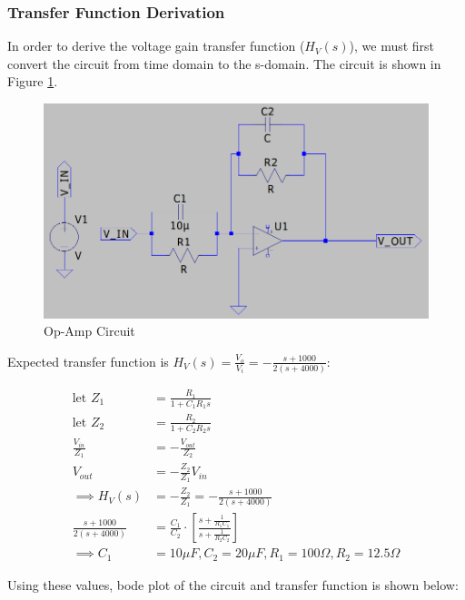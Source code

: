 \subsubsection{Transfer Function Derivation}
In order to derive the voltage gain transfer function ($H_{V}(s)$), we must first convert the circuit from time domain to the s-domain. The circuit is shown in Figure \ref{fig:op_amp_circuit}.

\begin{figure}[h]
    \centering
    \includegraphics[width=1\textwidth]{assets/opamp-circ.png}
    \caption{Op-Amp Circuit}
    \label{fig:op_amp_circuit}
\end{figure}

\noindent Expected transfer function is $H_{V}(s) = \frac{V_{o}}{V_{i}} = -\frac{s+1000}{2(s+4000)}$:


\begin{align*}
    \text{let } Z_1 &= \frac{R_1}{1 + C_1 R_1 s} \\
    \text{let } Z_2 &= \frac{R_2}{1 + C_2 R_2 s} \\
    \frac{V_{in}}{Z_1} &= -\frac{V_{out}}{Z_2}\\
    V_{out} &= -\frac{Z_2}{Z_1} V_{in} \\
    \implies H_{V}(s) &= -\frac{Z_2}{Z_1} = -\frac{s+1000}{2(s+4000)} \\
    \frac{s+1000}{2(s+4000)} &= \frac{C_1}{C_2}\cdot \left[ \frac{s + \frac{1}{R_1 C_1}}{s + \frac{1}{R_2 C_2}} \right] \\
    \implies C_1 &= 10\mu F, C_2 = 20\mu F, R_1 = 100\Omega, R_2 = 12.5\Omega
\end{align*}

\newpage
\thispagestyle{plain}

Using these values, bode plot of the circuit and transfer function is shown below:

